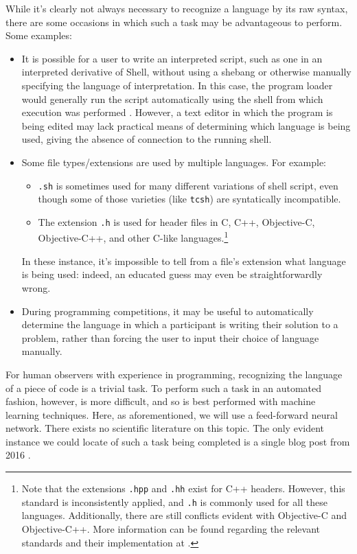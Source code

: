 \documentclass{article}
\begin{document}
While it's clearly not always necessary to recognize a language by its raw syntax, there are some occasions in which such a task may be advantageous to perform. Some examples:
\begin{itemize}
  \item{It is possible for a user to write an interpreted script, such as one in an interpreted derivative of Shell, without using a shebang or otherwise manually specifying the language of interpretation. In this case, the program loader would generally run the script automatically using the shell from which execution was performed \cite{shebang}. However, a text editor in which the program is being edited may lack practical means of determining which language is being used, giving the absence of connection to the running shell.}
  \item{Some file types/extensions are used by multiple languages. For example:
  \begin{itemize}
    \item{\texttt{.sh} is sometimes used for many different variations of shell script, even though some of those varieties (like \texttt{tcsh}) are syntatically incompatible.}
    \item{The extension \texttt{.h} is used for header files in C, C++, Objective-C, Objective-C++, and other C-like languages.\footnote{Note that the extensions \texttt{.hpp} and \texttt{.hh} exist for C++ headers. However, this standard is inconsistently applied, and \texttt{.h} is commonly used for all these languages. Additionally, there are still conflicts evident with Objective-C and Objective-C++. More information can be found regarding the relevant standards and their implementation at \cite{atomh}.}}
  \end{itemize}
  In these instance, it's impossible to tell from a file's extension what language is being used: indeed, an educated guess may even be straightforwardly wrong.}
  \item{During programming competitions, it may be useful to automatically determine the language in which a participant is writing their solution to a problem, rather than forcing the user to input their choice of language manually.}
\end{itemize}
For human observers with experience in programming, recognizing the language of a piece of code is a trivial task. To perform such a task in an automated fashion, however, is more difficult, and so is best performed with machine learning techniques. Here, as aforementioned, we will use a feed-forward neural network. There exists no scientific literature on this topic. The only evident instance we could locate of such a task being completed is a single blog post from 2016 \cite{proglangidmedium}.
\end{document}
